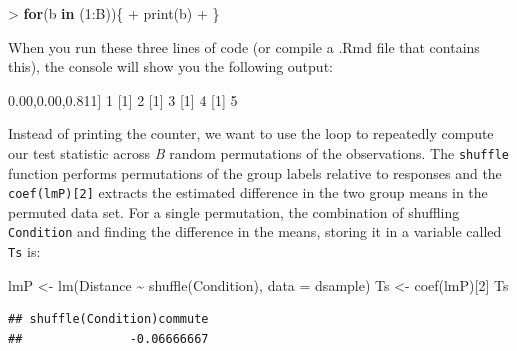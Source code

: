 \documentclass[
]{book}
\newenvironment{Shaded}{\begin{snugshade}}{\end{snugshade}}
\newcommand{\AttributeTok}[1]{\textcolor[rgb]{0.77,0.63,0.00}{#1}}
\newcommand{\ControlFlowTok}[1]{\textcolor[rgb]{0.13,0.29,0.53}{\textbf{#1}}}
\newcommand{\DecValTok}[1]{\textcolor[rgb]{0.00,0.00,0.81}{#1}}
\newcommand{\FunctionTok}[1]{\textcolor[rgb]{0.00,0.00,0.00}{#1}}
\newcommand{\NormalTok}[1]{#1}
\newcommand{\OtherTok}[1]{\textcolor[rgb]{0.56,0.35,0.01}{#1}}
\newcommand{\SpecialCharTok}[1]{\textcolor[rgb]{0.00,0.00,0.00}{#1}}
\begin{document}
\begin{Shaded}
\begin{Highlighting}[]
\SpecialCharTok{\textgreater{}} \ControlFlowTok{for}\NormalTok{(b }\ControlFlowTok{in}\NormalTok{ (}\DecValTok{1}\SpecialCharTok{:}\NormalTok{B))\{}
\SpecialCharTok{+}   \FunctionTok{print}\NormalTok{(b)}
\SpecialCharTok{+}\NormalTok{ \}}
\end{Highlighting}
\end{Shaded}

When you run these three lines of code (or compile a .Rmd file that contains this), the console will show you the following
output:

\begin{Shaded}
\begin{Highlighting}[]
\NormalTok{[}\DecValTok{1}\NormalTok{] }\DecValTok{1}
\NormalTok{[}\DecValTok{1}\NormalTok{] }\DecValTok{2}
\NormalTok{[}\DecValTok{1}\NormalTok{] }\DecValTok{3}
\NormalTok{[}\DecValTok{1}\NormalTok{] }\DecValTok{4}
\NormalTok{[}\DecValTok{1}\NormalTok{] }\DecValTok{5}
\end{Highlighting}
\end{Shaded}

\indent Instead of printing the counter, we want to use the loop to repeatedly compute
our test statistic across \emph{B} random permutations of the observations. The
\texttt{shuffle} function performs permutations of the group labels relative to
responses and the \texttt{coef(lmP){[}2{]}} extracts the estimated difference in the two group means in the permuted
data set. For a single permutation, the combination of shuffling \texttt{Condition} and
finding the difference in the means, storing it in a variable called \texttt{Ts} is:

\newpage

\begin{Shaded}
\begin{Highlighting}[]
\NormalTok{lmP }\OtherTok{\textless{}{-}} \FunctionTok{lm}\NormalTok{(Distance }\SpecialCharTok{\textasciitilde{}} \FunctionTok{shuffle}\NormalTok{(Condition), }\AttributeTok{data =}\NormalTok{ dsample)}
\NormalTok{Ts }\OtherTok{\textless{}{-}} \FunctionTok{coef}\NormalTok{(lmP)[}\DecValTok{2}\NormalTok{]}
\NormalTok{Ts}
\end{Highlighting}
\end{Shaded}

\begin{verbatim}
## shuffle(Condition)commute 
##               -0.06666667
\end{verbatim}
\end{document}
